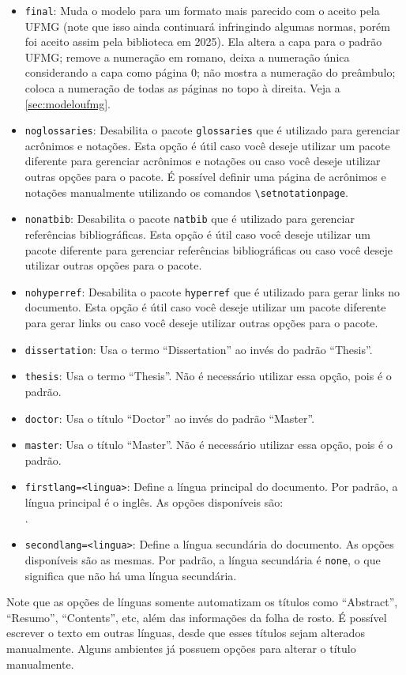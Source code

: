 \documentclass[dissertation,master,firstlang=english,secondlang=brazil]{macrothesis}
\begin{document}
\begin{itemize}
    \item \texttt{final}: Muda o modelo para um formato mais parecido com o aceito pela UFMG (note que isso ainda continuará infringindo algumas normas, porém foi aceito assim pela biblioteca em 2025). Ela altera a capa para o padrão UFMG; remove a numeração em romano, deixa a numeração única considerando a capa como página 0; não mostra a numeração do preâmbulo; coloca a numeração de todas as páginas no topo à direita. Veja a \cref{sec:modeloufmg}.
    \item \texttt{noglossaries}: Desabilita o pacote \texttt{glossaries} que é utilizado para gerenciar acrônimos e notações. Esta opção é útil caso você deseje utilizar um pacote diferente para gerenciar acrônimos e notações ou caso você deseje utilizar outras opções para o pacote. É possível definir uma página de acrônimos e notações manualmente utilizando os comandos \texttt{\textbackslash setnotationpage}.
    \item \texttt{nonatbib}: Desabilita o pacote \texttt{natbib} que é utilizado para gerenciar referências bibliográficas. Esta opção é útil caso você deseje utilizar um pacote diferente para gerenciar referências bibliográficas ou caso você deseje utilizar outras opções para o pacote.
    \item \texttt{nohyperref}: Desabilita o pacote \texttt{hyperref} que é utilizado para gerar links no documento. Esta opção é útil caso você deseje utilizar um pacote diferente para gerar links ou caso você deseje utilizar outras opções para o pacote.
    \item \texttt{dissertation}: Usa o termo ``Dissertation'' ao invés do padrão ``Thesis''.
    \item \texttt{thesis}: Usa o termo ``Thesis''. Não é necessário utilizar essa opção, pois é o padrão.
    \item \texttt{doctor}: Usa o título ``Doctor'' ao invés do padrão ``Master''.
    \item \texttt{master}: Usa o título ``Master''. Não é necessário utilizar essa opção, pois é o padrão.
    \item \texttt{firstlang=<lingua>}: Define a língua principal do documento. Por padrão, a língua principal é o inglês. As opções disponíveis são: \\\emph{\supportedlangs}. 
    \item \texttt{secondlang=<lingua>}: Define a língua secundária do documento. As opções disponíveis são as mesmas. Por padrão, a língua secundária é \texttt{none}, o que significa que não há uma língua secundária.
\end{itemize}
Note que as opções de línguas somente automatizam os títulos como ``Abstract'', ``Resumo'', ``Contents'', etc, além das informações da folha de rosto. É possível escrever o texto em outras línguas, desde que esses títulos sejam alterados manualmente. Alguns ambientes já possuem opções para alterar o título manualmente.
\end{document}
